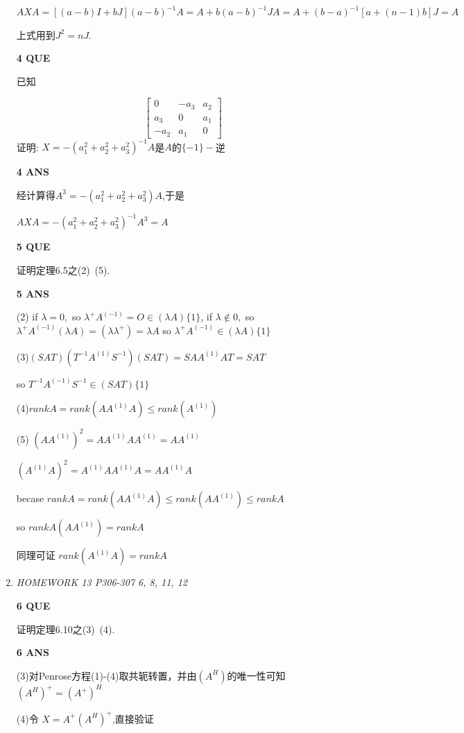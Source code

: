 \documentclass[11pt,letterpaper]{ctexart}
\begin{document}
\begin{enumerate}
$AXA = [(a - b) I + bJ](a - b)^{-1}A = A + b(a - b)^{-1}JA = A +(b - a)^{-1}[a + (n - 1)b]J = A$

上式用到$J^2 = nJ$.

\textbf{4 QUE}
\bigskip

已知

\[  \begin{bmatrix}
	0 & -a_3 & a_2 \\
	a_3 & 0 & a_1 \\
	-a_2 & a_1 & 0
\end{bmatrix}\]
证明: $X = -(a_1^{2} + a_2^{2} + a_3^{2})^{-1}A$是$A$的$\{-1\}-$逆


\textbf{4 ANS}
\bigskip

经计算得$A^3 = -(a_1^2 + a_2^2 +a_3^2)A$,于是 

$AXA = - (a_1^2 + a_2^2 +a_3^2)^{-1}A^3 = A$

\textbf{5 QUE}
\bigskip

证明定理6.5之(2)~(5).


\textbf{5 ANS}
\bigskip


(2) if $\lambda = 0,$ so $\lambda^{+}A^{(-1)} = O \in (\lambda A )\{1\}$, if $\lambda \notin 0,$ so $\lambda^{+}A^{(-1)}(\lambda A) = 
(\lambda \lambda^{+}) = \lambda A$ so $\lambda^{+}A^{(-1)} \in (\lambda A)\{1\}$

(3)$(SAT)(T^{-1}A^{(1)}S^{-1})(SAT) = SAA^{(1)}AT = SAT$

so $T^{-1}A^{(-1)}S^{-1} \in (SAT)\{1\}$

(4)$rankA = rank(AA^{(1)}A) \leq rank(A^{(1)})$

(5) $(AA^{(1)})^2 = AA^{(1)}AA^{(1)} = AA^{(1)}$

$(A^{(1)}A)^2 = A^{(1)}AA^{(1)}A = AA^{(1)}A$

becase $rankA = rank(AA^{(1)}A) \leq rank(AA^{(1)}) \leq rankA$

so $rankA(AA^{(1)}) = rankA$

同理可证 $rank(A^{(1)}A) = rankA$


\item \textit{HOMEWORK 13 {P306-307 6, 8, 11, 12}}%

\textbf{6 QUE}
\bigskip

证明定理6.10之(3)~(4).


\textbf{6 ANS}
\bigskip

(3)对Penrose方程(1)-(4)取共轭转置，并由$(A^H)$的唯一性可知$(A^H)^{+} = (A^{+})^H$

(4)令 $X = A^{+}(A^H)^{+}$,直接验证


\end{enumerate}
\end{document}
